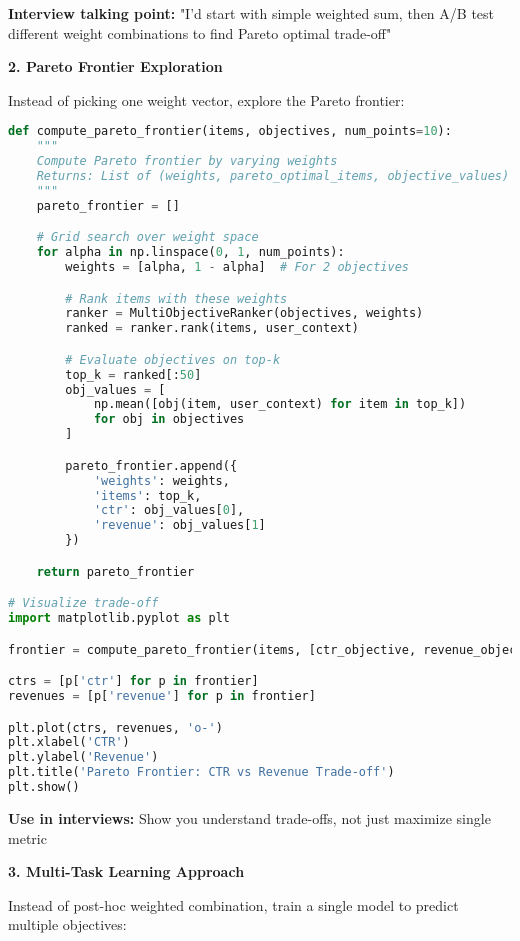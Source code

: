 \documentclass[10pt]{article}
\begin{document}
\textbf{Interview talking point:} "I'd start with simple weighted sum, then A/B test different weight combinations to find Pareto optimal trade-off"

\textbf{2. Pareto Frontier Exploration}

Instead of picking one weight vector, explore the Pareto frontier:

\begin{lstlisting}[language=Python]
def compute_pareto_frontier(items, objectives, num_points=10):
    """
    Compute Pareto frontier by varying weights
    Returns: List of (weights, pareto_optimal_items, objective_values)
    """
    pareto_frontier = []

    # Grid search over weight space
    for alpha in np.linspace(0, 1, num_points):
        weights = [alpha, 1 - alpha]  # For 2 objectives

        # Rank items with these weights
        ranker = MultiObjectiveRanker(objectives, weights)
        ranked = ranker.rank(items, user_context)

        # Evaluate objectives on top-k
        top_k = ranked[:50]
        obj_values = [
            np.mean([obj(item, user_context) for item in top_k])
            for obj in objectives
        ]

        pareto_frontier.append({
            'weights': weights,
            'items': top_k,
            'ctr': obj_values[0],
            'revenue': obj_values[1]
        })

    return pareto_frontier

# Visualize trade-off
import matplotlib.pyplot as plt

frontier = compute_pareto_frontier(items, [ctr_objective, revenue_objective])

ctrs = [p['ctr'] for p in frontier]
revenues = [p['revenue'] for p in frontier]

plt.plot(ctrs, revenues, 'o-')
plt.xlabel('CTR')
plt.ylabel('Revenue')
plt.title('Pareto Frontier: CTR vs Revenue Trade-off')
plt.show()
\end{lstlisting}

\textbf{Use in interviews:} Show you understand trade-offs, not just maximize single metric

\textbf{3. Multi-Task Learning Approach}

Instead of post-hoc weighted combination, train a single model to predict multiple objectives:
\end{document}

